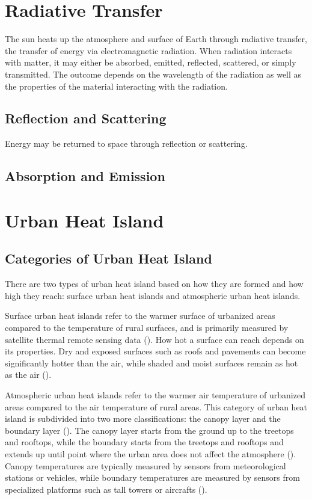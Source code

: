 \section{Radiative Transfer}

	The sun heats up the atmosphere and surface of Earth through radiative transfer, the transfer of energy via electromagnetic radiation.
	When radiation interacts with matter, it may either be absorbed, emitted, reflected, scattered, or simply transmitted.
	The outcome depends on the wavelength of the radiation as well as the properties of the material interacting with the radiation.

	\subsection{Reflection and Scattering}
	Energy may be returned to space through reflection or scattering.

	\subsection{Absorption and Emission}
	
	\blindtext

\section{Urban Heat Island}

	\subsection{Categories of Urban Heat Island}
	
	There are two types of urban heat island based on how they are formed and how high they reach:
	surface urban heat islands and atmospheric urban heat islands.

	Surface urban heat islands refer to the warmer surface of urbanized areas compared to the temperature of rural surfaces, and is primarily measured by satellite thermal remote sensing data (\cite{Zhou2018}). 
	How hot a surface can reach depends on its properties.
	Dry and exposed surfaces such as roofs and pavements can become significantly hotter than the air, while shaded and moist surfaces remain as hot as the air (\cite{Khan2021}). 
	
	Atmospheric urban heat islands refer to the warmer air temperature of urbanized areas compared to the air temperature of rural areas.
	This category of urban heat island is subdivided into two more classifications:
	the canopy layer and the boundary layer (\cite{Zhou2018}).
	The canopy layer starts from the ground up to the treetops and rooftops, 
	while the boundary starts from the treetops and rooftops and extends up until point where the urban area does not affect the atmosphere (\cite{Khan2021}).
	Canopy temperatures are typically measured by sensors from meteorological stations or vehicles,
	while boundary temperatures are measured by sensors from specialized platforms such as tall towers or aircrafts (\cite{Zhou2018}).

